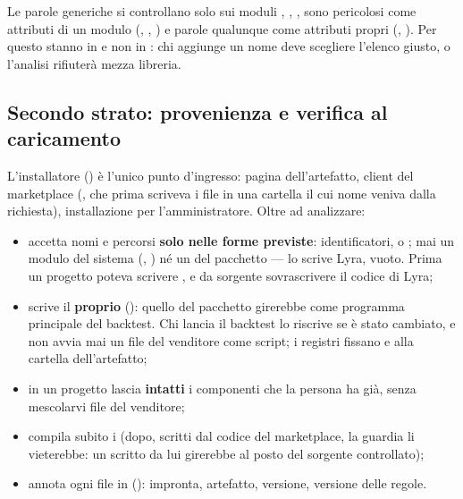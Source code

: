 \begin{attenzione}{Le parole generiche si controllano solo sui moduli}
, , ,  sono pericolosi come
attributi di un modulo (, ,
) e parole qualunque come attributi propri
(, ). Per questo stanno in
 e non in : chi aggiunge un
nome deve scegliere l'elenco giusto, o l'analisi rifiuterà mezza libreria.
\end{attenzione}

\subsection{Secondo strato: provenienza e verifica al caricamento}

L'installatore () è l'unico punto
d'ingresso: pagina dell'artefatto, client del marketplace
(, che prima scriveva i file in una
cartella il cui nome veniva dalla richiesta), installazione per
l'amministratore. Oltre ad analizzare:

\begin{itemize}
  \item accetta nomi e percorsi \textbf{solo nelle forme previste}:
        identificatori,  o
        ; mai un modulo del sistema
        (, ) né un
         del pacchetto --- lo scrive Lyra, vuoto. Prima
        un progetto poteva scrivere , e da
        sorgente sovrascrivere il codice di Lyra;
  \item scrive il \textbf{proprio} 
        (): quello del pacchetto girerebbe come
        programma principale del backtest. Chi lancia il backtest lo riscrive
        se è stato cambiato, e non avvia mai un file del venditore come
        script; i registri fissano  e
         alla cartella dell'artefatto;
  \item in un progetto lascia \textbf{intatti} i componenti che la persona ha
        già, senza mescolarvi file del venditore;
  \item compila subito i  (dopo, scritti dal codice del
        marketplace, la guardia li vieterebbe: un  scritto da lui
        girerebbe al posto del sorgente controllato);
  \item annota ogni file in 
        (): impronta, artefatto, versione, versione
        delle regole.
\end{itemize}


